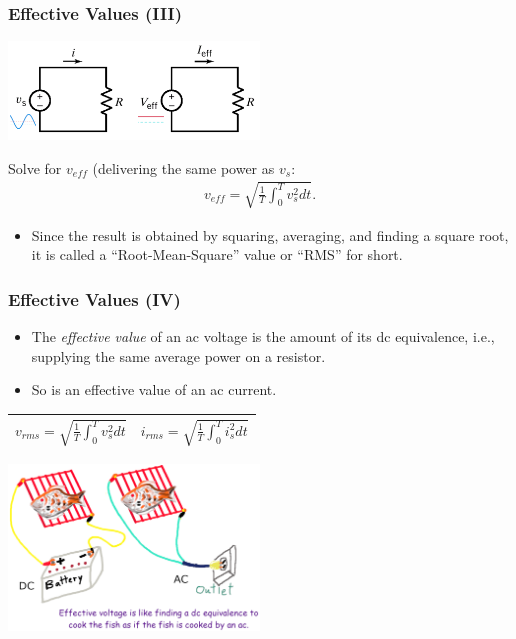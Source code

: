 \documentclass{beamer}
\begin{document}

\begin{frame}[fragile]
\frametitle{Effective Values (III)}

\begin{center}
\includegraphics[width=0.5\textwidth]{src/effective.png}
\end{center}

Solve for $v_{eff}$ (delivering the same power as $v_s$:
%
\begin{eqnarray}
v_{eff} = \sqrt{\frac{1}{T} \int_0^T v_s^2 dt}
\label{eq: rms}.
\end{eqnarray}

\begin{itemize}
\item Since the result is obtained by squaring, averaging, and finding a square root, it is called a ``Root-Mean-Square'' value or ``RMS'' for short.
\end{itemize}

\end{frame}


\begin{frame}[fragile]
\frametitle{Effective Values (IV)}

\begin{itemize}
\item The \emph{effective value} of an ac voltage is the amount of its dc equivalence, i.e., supplying the same average power on a resistor.
\item So is an effective value of an ac current.
\end{itemize}

\begin{center}
\begin{tabular}{|c|c|}
\hline
$v_{rms} = \sqrt{\frac{1}{T} \int_0^T v_s^2 dt}$
&
$i_{rms} = \sqrt{\frac{1}{T} \int_0^T i_s^2 dt}$
\\ \hline
\end{tabular}
\end{center}

\begin{center}
\includegraphics[width=0.5\textwidth]{src/rmsFish.png}
\end{center}

\end{frame}
\end{document}
